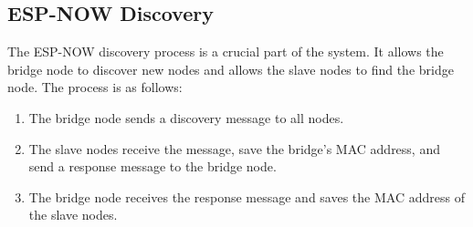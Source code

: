     \subsection{ESP-NOW Discovery}
    The ESP-NOW discovery process is a crucial part of the system. It allows the
    bridge node to discover new nodes and allows the slave nodes to find the bridge
    node. The process is as follows:
    \begin{enumerate}
        \item The bridge node sends a discovery message to all nodes.
        \item The slave nodes receive the message, save the bridge's MAC address, and
        send a response message to the bridge node.
        \item The bridge node receives the response message and saves the MAC address
        of the slave nodes.
    \end{enumerate}